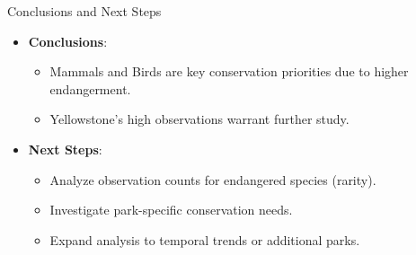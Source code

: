 \documentclass{beamer}
\begin{document}
\begin{frame}{Conclusions and Next Steps}
    \begin{itemize}
        \item \textbf{Conclusions}:
        \begin{itemize}
            \item Mammals and Birds are key conservation priorities due to higher endangerment.
            \item Yellowstone’s high observations warrant further study.
        \end{itemize}
        \item \textbf{Next Steps}:
        \begin{itemize}
            \item Analyze observation counts for endangered species (rarity).
            \item Investigate park-specific conservation needs.
            \item Expand analysis to temporal trends or additional parks.
        \end{itemize}
    \end{itemize}
\end{frame}
\end{document}
